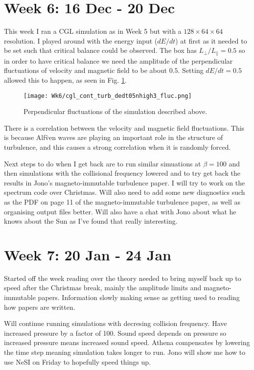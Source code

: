 \documentclass[12pt,letterpaper]{article}
\begin{document}
  \newpage
  \section*{Week 6: 16 Dec - 20 Dec}

  This week I ran a CGL simulation as in Week 5 but with a $128\times 64\times 64$ resolution. I played around with the energy input ($dE/dt$) at first as it needed to be set such that critical balance could be observed. The box has $L_\perp/L_\|=0.5$ so in order to have critical balance we need the amplitude of the perpendicular fluctuations of velocity and magnetic field to be about $0.5$. Setting $dE/dt=0.5$ allowed this to happen, as seen in Fig. \ref{fig:sim_fluc}.

  \begin{figure}[!h]
   \centering
  \texttt{[image: Wk6/cgl\_cont\_turb\_dedt05nhigh3\_fluc.png]}

  \caption{Perpendicular fluctuations of the simulation described above.}
  \label{fig:sim_fluc}
  \end{figure}

  There is a correlation between the velocity and magnetic field fluctuations. This is because Alf\`ven waves are playing an important role in the structure of turbulence, and this causes a strong correlation when it is randomly forced.

  Next steps to do when I get back are to run similar simuations at $\beta=100$ and then simulations with the collisional frequency lowered and to try get back the results in Jono's magneto-immutable turbulence paper. I will try to work on the spectrum code over Christmas. Will also need to add some new diagnostics such as the PDF on page 11 of the magneto-immutable turbulence paper, as well as organising output files better. Will also have a chat with Jono about what he knows about the Sun as I've found that really interesting.

  \newpage
  \section*{Week 7: 20 Jan - 24 Jan}

  Started off the week reading over the theory needed to bring myself back up to speed after the Christmas break, mainly the amplitude limits and magneto-immutable papers. Information slowly making sense as getting used to reading how papers are written.

  Will continue running simulations with decresing collision frequency. Have increased pressure by a factor of 100. Sound speed depends on pressure so increased pressure means increased sound speed. Athena compensates by lowering the time step meaning simulation takes longer to run. Jono will show me how to use NeSI on Friday to hopefully speed things up.
\end{document}
